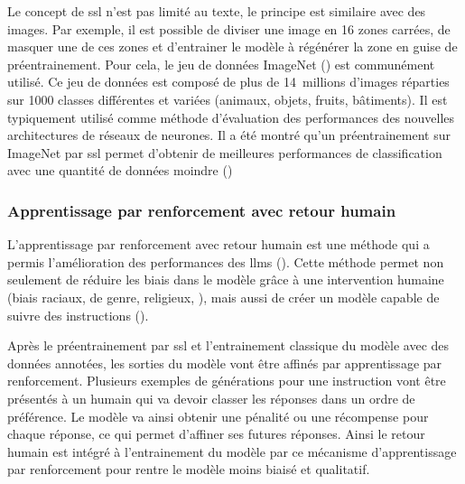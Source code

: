 Le concept de \gls{ssl} n'est pas limité au texte, le principe est similaire avec des images. Par exemple, il est possible de diviser une image en 16 zones carrées, de masquer une de ces zones et d'entrainer le modèle à régénérer la zone en guise de préentrainement. Pour cela, le jeu de données ImageNet (\cite{deng_imagenet_2009}) est communément utilisé. Ce jeu de données est composé de plus de 14~millions d'images réparties sur 1000 classes différentes et variées (animaux, objets, fruits, bâtiments). Il est typiquement utilisé comme méthode d'évaluation des performances des nouvelles architectures de réseaux de neurones. Il a été montré qu'un préentrainement sur ImageNet par \gls{ssl} permet d'obtenir de meilleures performances de classification avec une quantité de données moindre (\cite{goyal_self-supervised_2021})

\subsubsection{Apprentissage par renforcement avec retour humain}
L'apprentissage par renforcement avec retour humain est une méthode qui a permis l'amélioration des performances des \gls{llms} (\cite{ziegler_fine-tuning_2020, stiennon_learning_2020}). Cette méthode permet non seulement de réduire les biais dans le modèle grâce à une intervention humaine (biais raciaux, de genre, religieux, \cite{ganguli_red_2022}), mais aussi de créer un modèle capable de suivre des instructions (\cite{ouyang_training_2022}).


Après le préentrainement par \gls{ssl} et l'entrainement classique du modèle avec des données annotées, les sorties du modèle vont être affinés par apprentissage par renforcement. Plusieurs exemples de générations pour une instruction vont être présentés à un humain qui va devoir classer les réponses dans un ordre de préférence. Le modèle va ainsi obtenir une pénalité ou une récompense pour chaque réponse, ce qui permet d'affiner ses futures réponses. Ainsi le retour humain est intégré à l'entrainement du modèle par ce mécanisme d'apprentissage par renforcement pour rentre le modèle moins biaisé et qualitatif.

